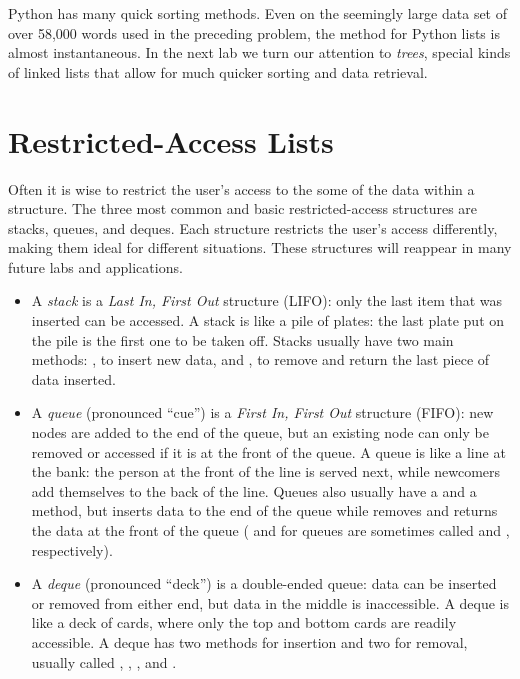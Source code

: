 \begin{figure>}
\begin{info}
Python has many quick sorting methods.
Even on the seemingly large data set of over 58,000 words used in the preceding problem, the  method for Python lists is almost instantaneous.
In the next lab we turn our attention to \emph{trees}, special kinds of linked lists that allow for much quicker sorting and data retrieval.
\end{info}

\section*{Restricted-Access Lists}
Often it is wise to restrict the user's access to the some of the data within a structure.
The three most common and basic restricted-access structures are stacks, queues, and deques.
Each structure restricts the user's access differently, making them ideal for different situations.
These structures will reappear in many future labs and applications.

\begin{itemize}
\item A \emph{stack} is a \emph{Last In, First Out} structure (LIFO): only the last item that was inserted can be accessed.
A stack is like a pile of plates: the last plate put on the pile is the first one to be taken off.
Stacks usually have two main methods: , to insert new data, and , to remove and return the last piece of data inserted.

\item A \emph{queue} (pronounced ``cue'') is a \emph{First In, First Out} structure (FIFO): new nodes are added to the end of the queue, but an existing node can only be removed or accessed if it is at the front of the queue.
A queue is like a line at the bank: the person at the front of the line is served next, while newcomers add themselves to the back of the line.
Queues also usually have a  and a  method, but  inserts data to the end of the queue while  removes and returns the data at the front of the queue ( and  for queues are sometimes called  and , respectively).

\item A \emph{deque} (pronounced ``deck'') is a double-ended queue: data can be inserted or removed from either end, but data in the middle is inaccessible.
A deque is like a deck of cards, where only the top and bottom cards are readily accessible.
A deque has two methods for insertion and two for removal, usually called , , , and .


\end{itemize}
\end{figure>}
